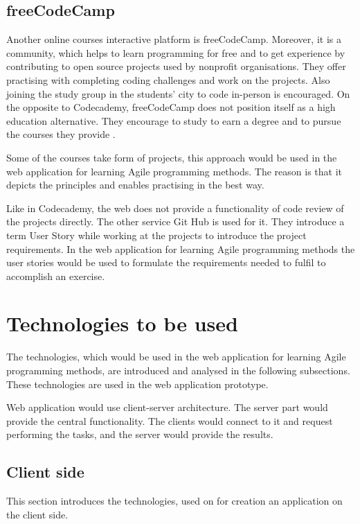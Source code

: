 \subsection{freeCodeCamp}

Another online courses interactive platform is freeCodeCamp. Moreover, it is a community, which helps to learn programming for free and to get experience by contributing to open source projects used by nonprofit organisations. They offer practising with completing coding challenges and work on the projects. Also joining the study group in the students' city to code in-person is encouraged. On the opposite to Codecademy, freeCodeCamp does not position itself as a high education alternative. They encourage to study to earn a degree and to pursue the courses they provide \cite{feecodecamp}.

Some of the courses take form of projects, this approach would be used in the web application for learning Agile programming methods. The reason is that it depicts the principles and enables practising in the best way. 

Like in Codecademy, the web does not provide a functionality of code review of the projects directly. The other service Git Hub is used for it. They introduce a term User Story while working at the projects to introduce the project requirements. In the web application for learning Agile programming methods the user stories would be used to formulate the requirements needed to fulfil to accomplish an exercise.

\section{Technologies to be used}
\label{sect:tech}

The technologies, which would be used in the web application for learning Agile programming methods, are introduced and analysed in the following subsections. These technologies are used in the web application prototype.

Web application would use client-server architecture. The server part would provide the central functionality. The clients would connect to it and request performing the tasks, and the server would provide the results.

\subsection{Client side}
This section introduces the technologies, used on for creation an application on the client side.

